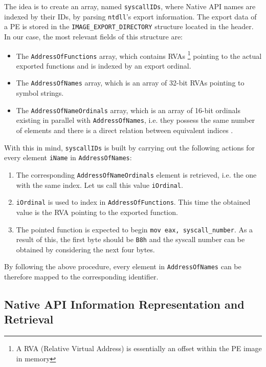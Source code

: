 The idea is to create an array, named \texttt{syscallIDs}, where Native API names are indexed by their IDs, by parsing \texttt{ntdll}'s export information. The export data of a PE is stored in the \texttt{IMAGE\_EXPORT\_DIRECTORY} structure located in the header. In our case, the most relevant fields of this structure are:

\begin{itemize}
\item The \texttt{AddressOfFunctions} array, which contains RVAs \footnote{A RVA (Relative Virtual Address) is essentially an offset within the PE image in memory} pointing to the actual exported functions and is indexed by an export ordinal.
\item The \texttt{AddressOfNames} array, which is an array of 32-bit RVAs pointing to symbol strings.
\item The \texttt{AddressOfNameOrdinals} array, which is an array of 16-bit ordinals existing in parallel with \texttt{AddressOfNames}, i.e. they possess the same number of elements and there is a direct relation between equivalent indices \cite{Sikorski:2012:PMA:2181153}.  
\end{itemize}

With this in mind, \texttt{syscallIDs} is built by carrying out the following actions for every element \texttt{iName} in \texttt{AddressOfNames}:

\begin{enumerate}
\item The corresponding \texttt{AddressOfNameOrdinals} element is retrieved, i.e. the one with the same index. Let us call this value \texttt{iOrdinal}.
\item \texttt{iOrdinal} is used to index in \texttt{AddressOfFunctions}. This time the obtained value is the RVA pointing to the exported function.
\item The pointed function is expected to begin \texttt{mov eax, syscall\_number}. As a result of this, the first byte should be \texttt{B8h} and the syscall number can be obtained by considering the next four bytes.  
\end{enumerate}

By following the above procedure, every element in \texttt{AddressOfNames} can be therefore mapped to the corresponding identifier. 

\subsection{Native API Information Representation and Retrieval}

